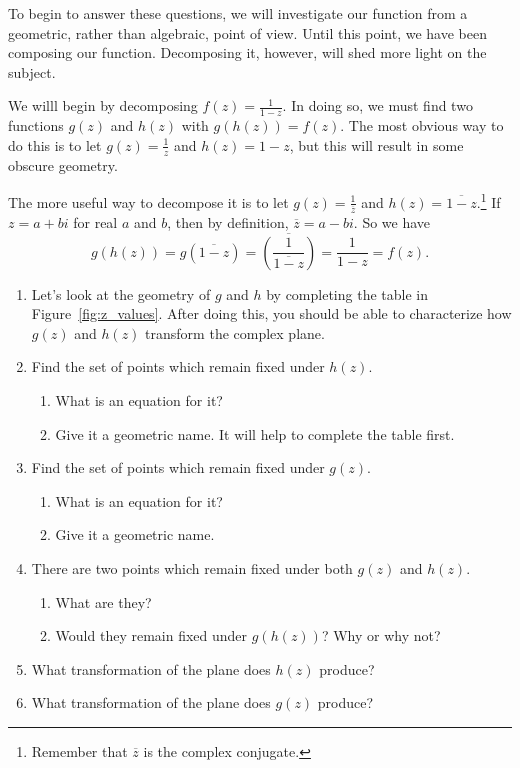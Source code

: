 \documentclass[../textbook.tex]{subfiles}
\begin{document}
To begin to answer these questions, we will investigate our function from a geometric, rather than algebraic, point of view. Until this point, we have been composing our function. Decomposing it, however, will shed more light on the subject.

We willl begin by decomposing $f(z)=\frac{1}{1-z}$. In doing so, we must find two functions $g(z)$ and $h(z)$ with $g(h(z))=f(z)$. The most obvious way to do this is to let $g(z)=\frac{1}{z}$ and $h(z)=1-z$, but this will result in some obscure geometry.

The more useful way to decompose it is to let $g(z)=\frac{1}{\overline{z}}$ and $h(z)=\overline{1-z}$.\footnote{Remember that $\overline{z}$ is the complex conjugate.} If $z=a+bi$ for real $a$ and $b$, then by definition, $\overline{z}=a-bi$. So we have
$$g(h(z))=g(\overline{1-z})=\overline{\left(\frac{1}{\overline{1-z}}\right)}=\frac{1}{1-z}=f(z).$$

\begin{enumerate}
\setcounter{enumi}{\value{problem_i}}
\item Let's look at the geometry of $g$ and $h$ by completing the table in Figure~\ref{fig:z_values}. After doing this, you should be able to characterize how $g(z)$ and $h(z)$ transform the complex plane.
\item Find the set of points which remain fixed under $h(z)$.
\begin{enumerate}
\item What is an equation for it?
\item Give it a geometric name. It will help to complete the table first.
\end{enumerate}
\item Find the set of points which remain fixed under $g(z)$.
\begin{enumerate}
\item What is an equation for it?
\item Give it a geometric name.
\end{enumerate}
\item There are two points which remain fixed under both $g(z)$ and $h(z)$.
\begin{enumerate}
\item What are they?
\item Would they remain fixed under $g(h(z))$? Why or why not?
\end{enumerate}
\item What transformation of the plane does $h(z)$ produce?
\item What transformation of the plane does $g(z)$ produce?
\setcounter{problem_i}{\value{enumi}}
\end{enumerate}
\end{document}
